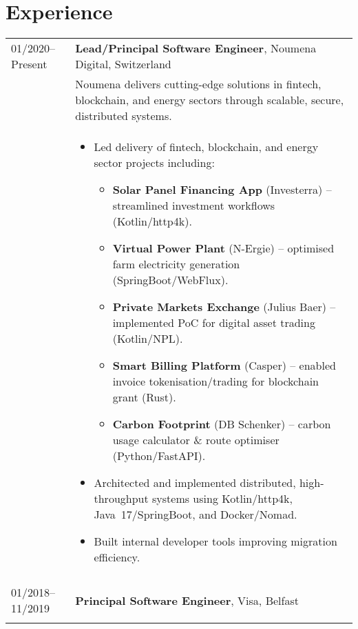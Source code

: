 \documentclass[2pt,a4paper]{article}
\newlength{\datecolumn}
\newlength{\textcolumn}
\begin{document}
\section*{Experience}
\begin{longtable}{p{\datecolumn} p{\textcolumn}}
01/2020--Present & \textbf{Lead/Principal Software Engineer}, Noumena Digital, Switzerland \\
                 & Noumena delivers cutting-edge solutions in fintech, blockchain, and energy sectors through scalable, secure, distributed systems. \\
                 & \begin{itemize}
                        \item Led delivery of fintech, blockchain, and energy sector projects including:
                        \begin{itemize}
                            \item \textbf{Solar Panel Financing App} (Investerra) – streamlined investment workflows (Kotlin/http4k).
                            \item \textbf{Virtual Power Plant} (N-Ergie) – optimised farm electricity generation (SpringBoot/WebFlux).
                            \item \textbf{Private Markets Exchange} (Julius Baer) – implemented PoC for digital asset trading (Kotlin/NPL).
                            \item \textbf{Smart Billing Platform} (Casper) – enabled invoice tokenisation/trading for blockchain grant (Rust).
                            \item \textbf{Carbon Footprint} (DB Schenker) – carbon usage calculator \& route optimiser (Python/FastAPI).
                        \end{itemize} 
                        \item Architected and implemented distributed, high-throughput systems using Kotlin/http4k, Java~17/SpringBoot, and Docker/Nomad.
                        \item Built internal developer tools improving migration efficiency.
                   \end{itemize} \\ \\
01/2018--11/2019 & \textbf{Principal Software Engineer}, Visa, Belfast \\
                 & \begin{itemize}

\end{itemize}
\end{longtable}
\end{document}
